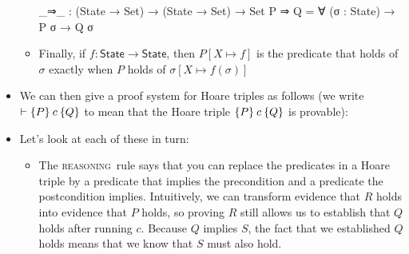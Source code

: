 \documentclass{lecturenotes}
\newcommand{\Skip}{\textsf{skip}}
\newcommand{\ite}[3]{\ensuremath{\textsf{if}\mkern5mu#1 \mathrel{\textsf{then}} #2 \mathrel{\textsf{else}} #3}}
\newcommand{\while}[2]{\ensuremath{\textsf{while}\mkern5mu#1 \mathrel{\textsf{do}} #2}}
\newcommand{\hoare}[3]{\ensuremath{\{#1\}\mkern4mu#2\mkern4mu\{#3\}}}
\begin{document}
\begin{itemize}
\begin{itemize}
\begin{code}
_⇒_ : (State → Set) → (State → Set) → Set
P ⇒ Q = ∀ (σ : State) → P σ → Q σ    
\end{code}
\item Finally, if $f \colon \textsf{State} \to \textsf{State}$, then $P[X \mapsto f]$ is the predicate that holds of $\sigma$ exactly when $P$ holds of $\sigma[X \mapsto f(\sigma)]$
  \end{itemize}
\item We can then give a proof system for Hoare triples as follows (we write $\vdash \hoare{P}{c}{Q}$ to mean that the Hoare triple $\hoare{P}{c}{Q}$ is provable):

\item Let's look at each of these in turn:
  \begin{itemize}
  \item The \textsc{reasoning}~rule says that you can replace the predicates in a Hoare triple by a predicate that implies the precondition and a predicate the postcondition implies.
    Intuitively, we can transform evidence that $R$ holds into evidence that $P$ holds, so proving $R$ still allows us to establish that $Q$ holds after running $c$.
    Because $Q$ implies $S$, the fact that we established $Q$ holds means that we know that $S$ must also hold.


\end{itemize}
\end{itemize}
\end{document}
